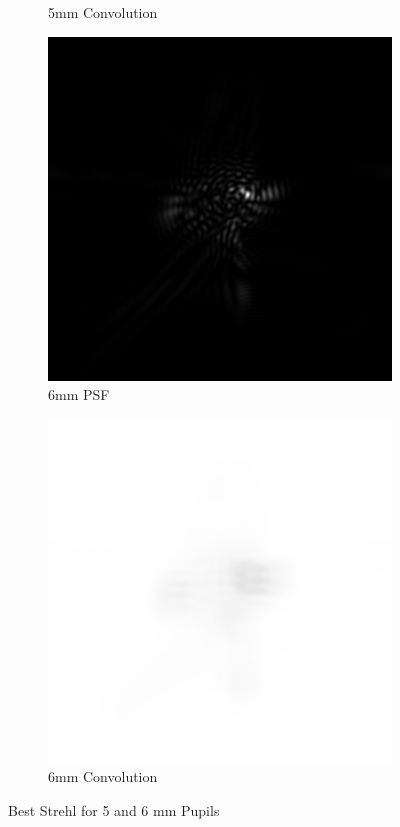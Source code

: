 \documentclass{article}
\begin{document}
\begin{figure}[H]
\begin{subfigure}{.25\textwidth}
  \caption{5mm Convolution}
  \label{fig:5mmStrehlconv}
\end{subfigure}
\begin{subfigure}{.25\textwidth}
  \centering
  \includegraphics[width=1\linewidth]{Vasha_R_G_0530_2_600_zer_02_6_PSF.png}
  \caption{6mm PSF}
  \label{fig:6mmStrehlpsf}
\end{subfigure}%
\begin{subfigure}{.25\textwidth}
  \centering
  \includegraphics[width=1\linewidth]{Vasha_R_G_0530_2_600_zer_02_6_PSF_convE.png}
  \caption{6mm Convolution}
  \label{fig:6mmStrehlconv}
\end{subfigure}
\caption{Best Strehl for 5 and 6 mm Pupils}
\label{fig:5and6mmStrehl}
\end{figure}
\end{document}
